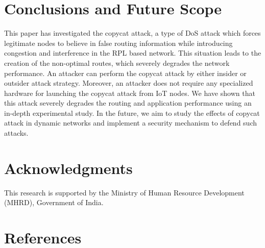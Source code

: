 \documentclass[]{svjour3}                     %
\begin{document}
\section{Conclusions and Future Scope}\label{Conclusions and Future Scope}

This paper has investigated the copycat attack, a type of DoS attack which forces legitimate nodes to believe in false routing information while introducing congestion and interference in the RPL based network. This situation leads to the creation of the non-optimal routes, which severely degrades the network performance. An attacker can perform the copycat attack by either insider or outsider attack strategy. Moreover, an attacker does not require any specialized hardware for launching the copycat attack from IoT nodes. We have shown that this attack severely degrades the routing and application performance using an in-depth experimental study. In the future, we aim to study the effects of copycat attack in dynamic networks and implement a security mechanism to defend such attacks.       


\section*{Acknowledgments}
This research is supported by the Ministry of Human Resource Development (MHRD), Government of India. 


\section*{References}
%
%
\end{document}
